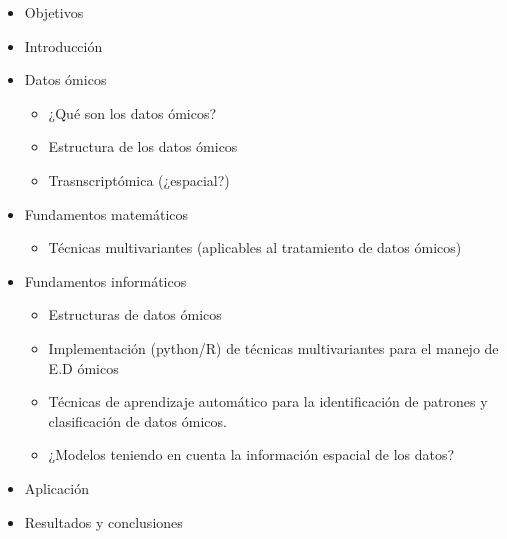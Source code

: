 \documentclass{article}
\begin{document}
\begin{itemize}
    \item Objetivos
    \item Introducción
    \item Datos ómicos
    \begin{itemize}
        \item ¿Qué son los datos ómicos?
        \item Estructura de los datos ómicos
        \item Trasnscriptómica (¿espacial?)
    \end{itemize}
    \item Fundamentos matemáticos
    \begin{itemize}
        \item Técnicas multivariantes (aplicables al tratamiento de datos ómicos)
    \end{itemize}
    \item Fundamentos informáticos
    \begin{itemize}
        \item Estructuras de datos ómicos
        \item Implementación (python/R) de técnicas multivariantes para el manejo de E.D ómicos
        \item Técnicas de aprendizaje automático para la identificación de patrones y clasificación de datos ómicos.
        \item ¿Modelos teniendo en cuenta la información espacial de los datos?
    \end{itemize}
    \item Aplicación
    \item Resultados y conclusiones
\end{itemize}
\end{document}
